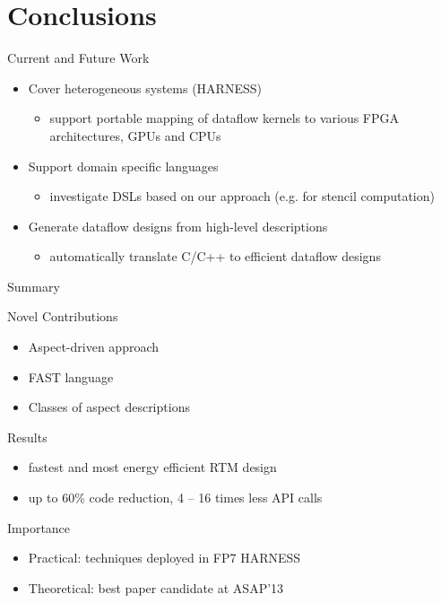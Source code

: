 \section{Conclusions}

\begin{frame}{Current and Future Work}

  \begin{itemize}
    \setlength{\itemsep}{10pt}

  \item Cover heterogeneous systems (HARNESS)
    \begin{itemize}
    \item support portable mapping of dataflow kernels to various FPGA
      architectures, GPUs and CPUs
    \end{itemize}

  \item Support domain specific languages
    \begin{itemize}
    \item investigate DSLs based on our approach (e.g. for stencil
      computation)
    \end{itemize}

  \item Generate dataflow designs from high-level descriptions
    \begin{itemize}
    \item automatically translate C/C++ to efficient dataflow designs
    \end{itemize}

  \end{itemize}
\end{frame}


\begin{frame}{Summary}
  \begin{beamerboxesrounded}{Novel Contributions}
    \begin{itemize}
    \item  Aspect-driven approach
    \item  FAST language
    \item  Classes of aspect descriptions
    \end{itemize}
  \end{beamerboxesrounded}
  \vspace{0.3cm}
  \begin{beamerboxesrounded}{Results}
    \begin{itemize}
    \item fastest and most energy efficient RTM design
    \item up to 60\% code reduction, 4 -- 16 times less API calls
    \end{itemize}
  \end{beamerboxesrounded}
  \vspace{0.3cm}
  \begin{beamerboxesrounded}{Importance}
    \begin{itemize}
    \item Practical: techniques deployed in FP7 HARNESS
    \item Theoretical: best paper candidate at ASAP'13
    \end{itemize}
  \end{beamerboxesrounded}
\end{frame}
